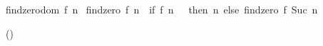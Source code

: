 \begin{isabellebody}
\begin{isamarkuptext}
\begin{minipage}{0.79\textwidth}
\begin{isabelle}
findzero{}dom\ {}{}f{}\ {}n{}\ {}\isanewline
findzero\ {}f\ {}n\ {}\ {}if\ {}f\ {}n\ {}\ {}\ then\ {}n\ else\ findzero\ {}f\ {}Suc\ {}n{}{}%
\end{isabelle}\end{minipage}
  \hfill()
  \vspace{1em}


\end{isamarkuptext}
\end{isabellebody}
